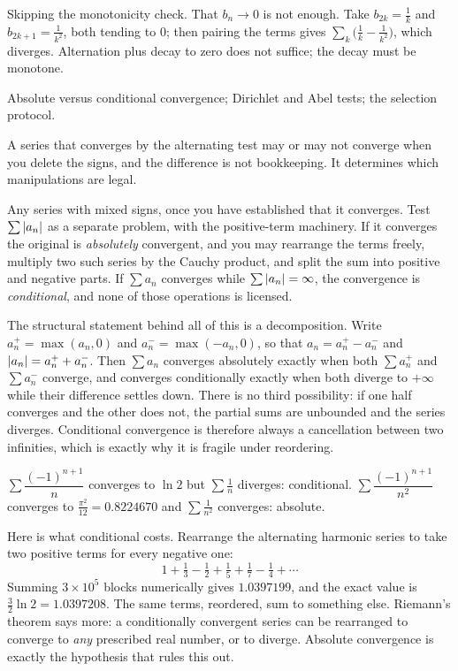 \begin{trap}
Skipping the monotonicity check. That $b_n\to0$ is not enough. Take $b_{2k}=\tfrac1k$ and $b_{2k+1}=\tfrac{1}{k^2}$, both tending to $0$; then pairing the terms gives $\sum_k\bigl(\tfrac1k-\tfrac{1}{k^2}\bigr)$, which diverges. Alternation plus decay to zero does not suffice; the decay must be monotone.
\end{trap}

\begin{seealsob}Absolute versus conditional convergence; Dirichlet and Abel tests; the selection protocol.\end{seealsob}

A series that converges by the alternating test may or may not converge when you delete the signs, and the difference is not bookkeeping. It determines which manipulations are legal.

\cue Any series with mixed signs, once you have established that it converges.
\method Test $\sum\left\lvert a_n\right\rvert$ as a separate problem, with the positive-term machinery. If it converges the original is \emph{absolutely} convergent, and you may rearrange the terms freely, multiply two such series by the Cauchy product, and split the sum into positive and negative parts. If $\sum a_n$ converges while $\sum\left\lvert a_n\right\rvert=\infty$, the convergence is \emph{conditional}, and none of those operations is licensed.

The structural statement behind all of this is a decomposition. Write $a_n^{+}=\max(a_n,0)$ and $a_n^{-}=\max(-a_n,0)$, so that $a_n=a_n^{+}-a_n^{-}$ and $\left\lvert a_n\right\rvert=a_n^{+}+a_n^{-}$. Then $\sum a_n$ converges absolutely exactly when both $\sum a_n^{+}$ and $\sum a_n^{-}$ converge, and converges conditionally exactly when both diverge to $+\infty$ while their difference settles down. There is no third possibility: if one half converges and the other does not, the partial sums are unbounded and the series diverges. Conditional convergence is therefore always a cancellation between two infinities, which is exactly why it is fragile under reordering.

\begin{worked}
$\sum\dfrac{(-1)^{n+1}}{n}$ converges to $\ln2$ but $\sum\tfrac1n$ diverges: conditional. $\sum\dfrac{(-1)^{n+1}}{n^2}$ converges to $\tfrac{\pi^2}{12}=0.8224670$ and $\sum\tfrac{1}{n^2}$ converges: absolute.

Here is what conditional costs. Rearrange the alternating harmonic series to take two positive terms for every negative one:
\[1+\tfrac13-\tfrac12+\tfrac15+\tfrac17-\tfrac14+\cdots\]
Summing $3\times10^5$ blocks numerically gives $1.0397199$, and the exact value is $\tfrac32\ln2=1.0397208$. The same terms, reordered, sum to something else. Riemann's theorem says more: a conditionally convergent series can be rearranged to converge to \emph{any} prescribed real number, or to diverge. Absolute convergence is exactly the hypothesis that rules this out.
\end{worked}


